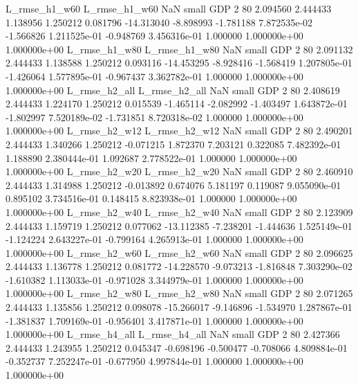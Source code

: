  L_rmse_h1_w60  L_rmse_h1_w60                   NaN      small      GDP                 2 80 2.094560       2.444433 1.138956       1.250212    0.081796    -14.313040     -8.898993    -1.781188   7.872535e-02 -1.566826 1.211525e-01    -0.948769   3.456316e-01            1.000000    1.000000e+00        1.000000e+00
 L_rmse_h1_w80  L_rmse_h1_w80                   NaN      small      GDP                 2 80 2.091132       2.444433 1.138588       1.250212    0.093116    -14.453295     -8.928416    -1.568419   1.207805e-01 -1.426064 1.577895e-01    -0.967437   3.362782e-01            1.000000    1.000000e+00        1.000000e+00
 L_rmse_h2_all  L_rmse_h2_all                   NaN      small      GDP                 2 80 2.408619       2.444433 1.224170       1.250212    0.015539     -1.465114     -2.082992    -1.403497   1.643872e-01 -1.802997 7.520189e-02    -1.731851   8.720318e-02            1.000000    1.000000e+00        1.000000e+00
 L_rmse_h2_w12  L_rmse_h2_w12                   NaN      small      GDP                 2 80 2.490201       2.444433 1.340266       1.250212   -0.071215      1.872370      7.203121     0.322085   7.482392e-01  1.188890 2.380444e-01     1.092687   2.778522e-01            1.000000    1.000000e+00        1.000000e+00
 L_rmse_h2_w20  L_rmse_h2_w20                   NaN      small      GDP                 2 80 2.460910       2.444433 1.314988       1.250212   -0.013892      0.674076      5.181197     0.119087   9.055090e-01  0.895102 3.734516e-01     0.148415   8.823938e-01            1.000000    1.000000e+00        1.000000e+00
 L_rmse_h2_w40  L_rmse_h2_w40                   NaN      small      GDP                 2 80 2.123909       2.444433 1.159719       1.250212    0.077062    -13.112385     -7.238201    -1.444636   1.525149e-01 -1.124224 2.643227e-01    -0.799164   4.265913e-01            1.000000    1.000000e+00        1.000000e+00
 L_rmse_h2_w60  L_rmse_h2_w60                   NaN      small      GDP                 2 80 2.096625       2.444433 1.136778       1.250212    0.081772    -14.228570     -9.073213    -1.816848   7.303290e-02 -1.610382 1.113033e-01    -0.971028   3.344979e-01            1.000000    1.000000e+00        1.000000e+00
 L_rmse_h2_w80  L_rmse_h2_w80                   NaN      small      GDP                 2 80 2.071265       2.444433 1.135856       1.250212    0.098078    -15.266017     -9.146896    -1.534970   1.287867e-01 -1.381837 1.709169e-01    -0.956401   3.417871e-01            1.000000    1.000000e+00        1.000000e+00
 L_rmse_h4_all  L_rmse_h4_all                   NaN      small      GDP                 2 80 2.427366       2.444433 1.243955       1.250212    0.045347     -0.698196     -0.500477    -0.708066   4.809884e-01 -0.352737 7.252247e-01    -0.677950   4.997844e-01            1.000000    1.000000e+00        1.000000e+00
